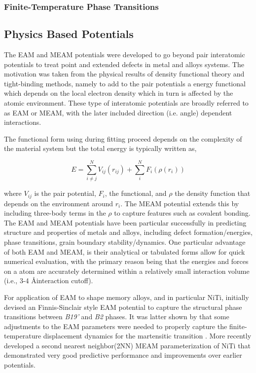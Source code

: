 \documentclass[preprint,colorlinks=true,linkcolor=black,citecolor=black]{elsarticle}
\begin{document}
\subsubsection{Finite-Temperature Phase Transitions}

\subsection{Physics Based Potentials}
\label{sec:physics_potentials}

The EAM and MEAM potentials were developed to go beyond pair
interatomic potentials to treat point and extended defects in metal
and alloys systems. The motivation was taken from the physical results
of density functional theory and tight-binding methods, namely to add
to the pair potentials a energy functional which depends on the local
electron density which in turn is affected by the atomic
environment. These type of interatomic potentials are broadly referred
to as EAM or MEAM, with the later included direction (i.e. angle)
dependent interactions. \par

The functional form using during fitting proceed depends on the
complexity of the material system but the total energy is typically
written as,

\begin{equation}
	\label{eq:eam}
	E = \sum_{i\neq j}^N V_{ij}(r_{ij}) + \sum_i^N F_i\left(\rho(r_i)\right)
\end{equation}

where $V_{ij}$ is the pair potential, $F_i$, the functional, and
$\rho$ the density function that depends on the environment around
$r_i$. The MEAM potential extends this by including three-body terms
in the $\rho$ to capture features such as covalent bonding. The EAM
and MEAM potentials have been particular successfully in predicting
structure and properties of metals and alloys, including defect
formation/energies, phase transitions, grain boundary
stability/dynamics. One particular advantage of both EAM and MEAM, is
their analytical or tabulated forms allow for quick numerical
evaluation, with the primary reason being that the energies and forces
on a atom are accurately determined within a relatively small
interaction volume (i.e., 3-4 \AA interaction cutoff).  \par

For application of EAM to shape memory alloys, and in particular NiTi,
\citet{Mutter2010} initially devised an Finnis-Sinclair style EAM
potential to capture the structural phase transitions between
\textit{B19'} and \textit{B2} phases. It was latter shown by
\cite{Zhong2011} that some adjustments to the EAM parameters were
needed to properly capture the finite-temperature displacement
dynamics for the martensitic transition \cite{Gur2017}. More recently
\citet{Ko2015} developed a second nearest neighbor(2NN) MEAM
parameterization of NiTi that demonstrated very good predictive
performance and improvements over earlier potentials.
\end{document}
